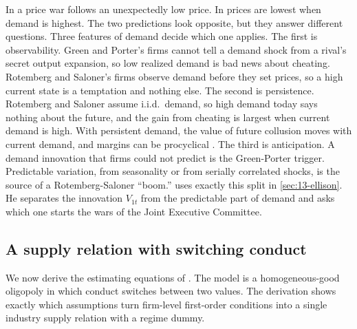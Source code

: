 \begin{remark}\label{rem:13-gp-vs-rs}
In \citet{GreenPorter1984} a price war follows an unexpectedly low price. In \citet{RotembergSaloner1986} prices are
lowest when demand is highest. The two predictions look opposite, but they answer different questions. Three
features of demand decide which one applies. The first is observability. Green and Porter's firms cannot tell a
demand shock from a rival's secret output expansion, so low realized demand is bad news about cheating. Rotemberg
and Saloner's firms observe demand before they set prices, so a high current state is a temptation and nothing else.
The second is persistence. Rotemberg and Saloner assume i.i.d.\ demand, so high demand today says nothing about the
future, and the gain from cheating is largest when current demand is high. With persistent demand, the value of
future collusion moves with current demand, and margins can be procyclical
\citep{HaltiwangerHarrington1991,BagwellStaiger1997}. The third is anticipation. A demand innovation that firms
could not predict is the Green-Porter trigger. Predictable variation, from seasonality or from serially correlated
shocks, is the source of a Rotemberg-Saloner ``boom.''  uses exactly this split in
\cref{sec:13-ellison}. He separates the innovation $V_{1t}$ from the predictable part of demand and asks which one
starts the wars of the Joint Executive Committee.
\end{remark}

\subsection{A supply relation with switching conduct}\label{sec:13-switching-model}

We now derive the estimating equations of \citet{Porter1983}. The model is a homogeneous-good oligopoly in which
conduct switches between two values. The derivation shows exactly which assumptions turn firm-level first-order
conditions into a single industry supply relation with a regime dummy.

